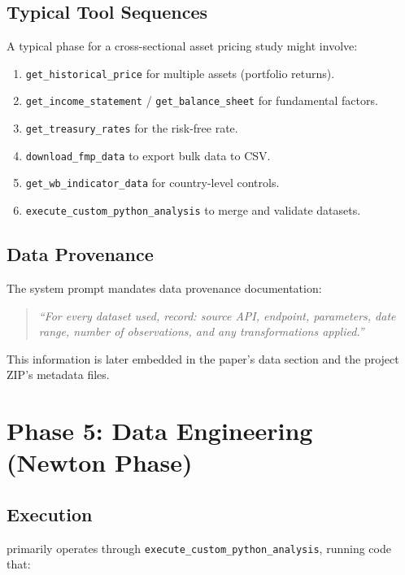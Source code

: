 \subsection{Typical Tool Sequences}

A typical \turing phase for a cross-sectional asset pricing study might involve:

\begin{enumerate}
  \item \texttt{get\_historical\_price} for multiple assets (portfolio returns).
  \item \texttt{get\_income\_statement} / \texttt{get\_balance\_sheet} for fundamental factors.
  \item \texttt{get\_treasury\_rates} for the risk-free rate.
  \item \texttt{download\_fmp\_data} to export bulk data to CSV.
  \item \texttt{get\_wb\_indicator\_data} for country-level controls.
  \item \texttt{execute\_custom\_python\_analysis} to merge and validate datasets.
\end{enumerate}

\subsection{Data Provenance}

The system prompt mandates data provenance documentation:
\begin{quote}
\itshape
``For every dataset used, record: source API, endpoint, parameters, date range, number of observations, and any transformations applied.''
\end{quote}

This information is later embedded in the paper's data section and the project ZIP's metadata files.

\section{Phase 5: Data Engineering (Newton Phase)}
\label{sec:pipeline:engineering}

\subsection{Execution}

\newton primarily operates through \texttt{execute\_custom\_python\_analysis}, running code that:

